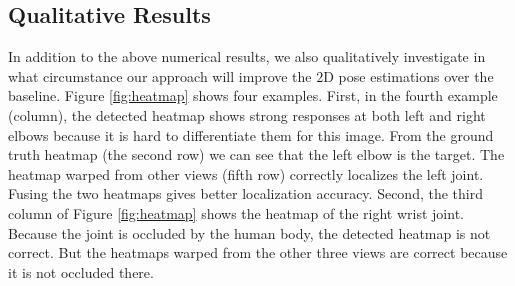 \documentclass[10pt,twocolumn,letterpaper]{article}
\begin{document}
\subsection{Qualitative Results}
In addition to the above numerical results, we also qualitatively investigate in what circumstance our approach will improve the $2$D pose estimations over the baseline. Figure \ref{fig:heatmap} shows four examples. First, in the fourth example (column), the detected heatmap shows strong responses at both left and right elbows because it is hard to differentiate them for this image. From the ground truth heatmap (the second row) we can see that the left elbow is the target. The heatmap warped from other views (fifth row) correctly localizes the left joint. Fusing the two heatmaps gives better localization accuracy. Second, the third column of Figure \ref{fig:heatmap} shows the heatmap of the right wrist joint. Because the joint is occluded by the human body, the detected heatmap is not correct. But the heatmaps warped from the other three views are correct because it is not occluded there.
\end{document}
